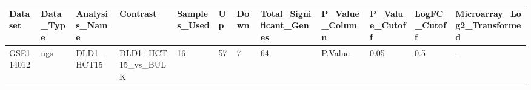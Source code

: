 \begingroup
\tiny
\setlength{\tabcolsep}{2pt}
\renewcommand{\arraystretch}{1.18}
\begin{tabular}{@{}llllllllllll@{}}
\toprule
Dataset & Data\_Type & Analysis\_Name & Contrast & Samples\_Used & Up & Down & Total\_Significant\_Genes & P\_Value\_Column & P\_Value\_Cutoff & LogFC\_Cutoff & Microarray\_Log2\_Transformed \\
\midrule
GSE114012 & ngs & DLD1\_HCT15 & DLD1+HCT15\_vs\_BULK & 16 & 57 & 7 & 64 & P.Value & 0.05 & 0.5 & -- \\
\bottomrule
\end{tabular}
\endgroup
